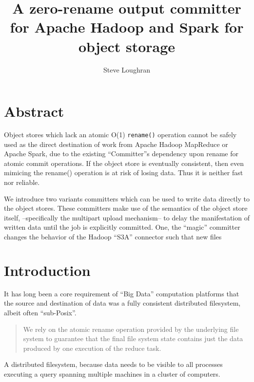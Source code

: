 \renewcommand{\baselinestretch}{1.5}

\parindent 0pt
\setlength{\parskip}{3ex}



\title{A zero-rename output committer for Apache Hadoop and Spark for object storage}
\author{Steve Loughran}
\maketitle


\section{Abstract}

Object stores which lack an atomic O(1) \texttt{rename()} operation cannot be safely used as the direct destination of work from Apache Hadoop MapReduce or Apache Spark, due to the existing ``Committer''s dependency upon rename for atomic commit operations. If the object store is eventually consistent, then even mimicing the rename() operation is at risk of losing data. Thus it is neither fast nor reliable.

We introduce two variants committers which can be used to write data directly to the object stores. These committers make use of the semantics of the object store itself, --specifically the multipart upload mechanism-- to delay the manifestation of written data until the job is explicitly committed. One, the ``magic'' committer changes the behavior of the Hadoop ``S3A'' connector such that new files

\section{Introduction}


It has long been a core requirement of ``Big Data'' computation platforms that the source and destination of data was a fully consistent distributed filesystem, albeit often ``sub-Posix''.

\begin{quote}
We rely on the atomic rename operation provided by the underlying file system to guarantee that the final file system state contains just the data produced by one execution of the reduce task.
\end{quote}
\cite{Dean:2004:MSD:1251254.1251264}

A distributed filesystem, because data needs to be visible to all processes executing a query spanning multiple machines in a cluster of computers. 

